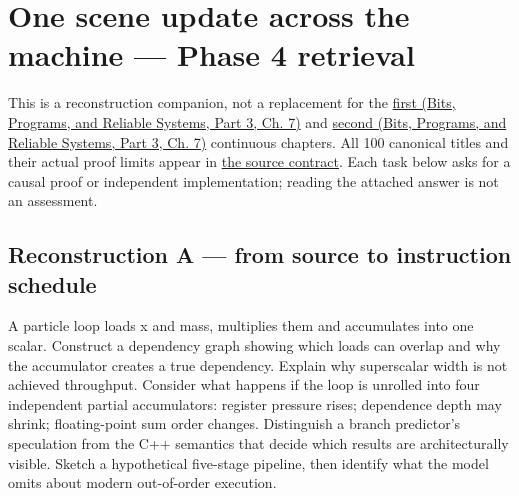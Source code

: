\hypertarget{appendix-2587680a4fe3}{}\label{referencestart:appendix-2587680a4fe3}
\section{One scene update across the machine --- Phase 4 retrieval}\label{appendix-2587680a4fe3-one-scene-update-across-the-machine-phase-4-retrieval}

\hypertarget{appendix-2587680a4fe3-one-scene-update-across-the-machine-phase-4-retrieval}{}

This is a reconstruction companion, not a replacement for the \href{../01-Bits-Programs-and-Reliable-Systems-P03/main.pdf\#01-foundations-i-ch007-from-a-correct-c-asset-service-to-the-instructions-a-cpu-can-execute-phase-4-m019m021-parts-301346}{first (Bits, Programs, and Reliable Systems, Part 3, Ch. 7)} and \href{../01-Bits-Programs-and-Reliable-Systems-P03/main.pdf\#01-foundations-i-ch007-from-temporary-memory-to-finished-parallel-frames-phase-4-m022m024-parts-347400}{second (Bits, Programs, and Reliable Systems, Part 3, Ch. 7)} continuous chapters. All 100 canonical titles and their actual proof limits appear in \hyperref[appendix-fd090d982a15-phase-4-cpu-architecture-and-measured-execution-parts-301400]{the source contract}. Each task below asks for a causal proof or independent implementation; reading the attached answer is not an assessment.

\subsection{Reconstruction A --- from source to instruction schedule}\label{appendix-2587680a4fe3-reconstruction-a-from-source-to-instruction-schedule}

\hypertarget{appendix-2587680a4fe3-reconstruction-a-from-source-to-instruction-schedule}{}

A particle loop loads x and mass, multiplies them and accumulates into one scalar. Construct a dependency graph showing which loads can overlap and why the accumulator creates a true dependency. Explain why superscalar width is not achieved throughput. Consider what happens if the loop is unrolled into four independent partial accumulators: register pressure rises; dependence depth may shrink; floating-point sum order changes. Distinguish a branch predictor's speculation from the C++ semantics that decide which results are architecturally visible. Sketch a hypothetical five-stage pipeline, then identify what the model omits about modern out-of-order execution.

